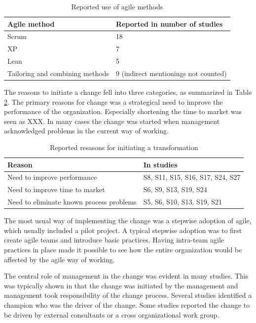 \documentclass[lnbip]{svmultln}
\begin{document}
\begin{table}[h]
    \begin{tabular}{ l@{ \hskip 0.4cm } l }
        \toprule
        Agile method    & Reported in number of studies   \\ \midrule
        Scrum           & 18 \\ 
        XP              & 7 \\
        Lean            & 5 \\
        Tailoring and combining methods & 9  (indirect mentionings not counted) \\
        \bottomrule
    \end{tabular}
    \caption{Reported use of agile methods}
    \label{table:methods}
\end{table}


The reasons to initiate a change fell into three categories, as summarized in
Table \ref{table:motivations}. The primary reasons for change was a strategical
need to improve the performance of the organization. Especially shortening the
time to market was seen as XXX. In many cases the change was started when
management acknowledged problems in the current way of working.

\begin{table}[h]
    \begin{tabular}{ l@{ \hskip 0.4cm } l }
        \toprule
        Reason                                    & In studies   \\ \midrule
        Need to improve performance               & S8, S11, S15, S16, S17, S24, S27 \\ 
        Need to improve time to market            & S6, S9, S13, S19, S24 \\
        Need to eliminate known process problems  & S5, S6, S10, S13, S19, S21 \\
        \bottomrule
    \end{tabular}
    \caption{Reported resasons for initiating a transformation}
    \label{table:motivations}
\end{table}


The most usual way of implementing the change was a stepwise adoption of agile,
which usually included a pilot project. A typical stepwise adoption was to first
create agile teams and introduce basic practices. Having intra-team agile
practices in place made it possible to see how the entire organization would be
affected by the agile way of working.

The central role of management in the change was evident in many studies. This
was typically shown in that the change was initiated by the management and
management took responsibility of the change process. Several studies identified
a champion who was the driver of the change. Some studies reported the change to
be driven by external consultants or a cross organizational work group.
\end{document}

